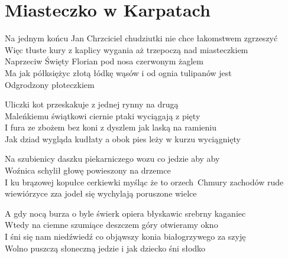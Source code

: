 \section{Miasteczko w Karpatach}
\begin{text}
Na jednym końcu Jan Chrzciciel chudziutki nie chce łakomstwem zgrzeszyć\\
Więc tłuste kury z kaplicy wygania aż trzepoczą nad miasteczkiem\\
Naprzeciw Święty Florian pod nosa czerwonym żaglem\\
Ma jak półksiężyc złotą łódkę wąsów i od ognia tulipanów jest\\
Odgrodzony płoteczkiem

Uliczki kot przeskakuje z jednej rynny na drugą\\
Maleńkiemu świątkowi ciernie ptaki wyciągają z pięty\\
I fura ze zbożem bez koni z dyszlem jak laską na ramieniu\\
Jak dziad wygląda kudłaty a obok pies leży w kurzu wyciągnięty

Na szubienicy daszku piekarniczego wozu co jedzie aby aby\\
Woźnica schylił głowę powieszony na drzemce\\
I ku brązowej kopułce cerkiewki myśląc że to orzech\
Chmury zachodów rude wiewiórzyce zza jodeł się wychylają poruszone wielce

A gdy nocą burza o byle świerk opiera błyskawic srebrny kaganiec\\
Wtedy na ciemne szumiące deszczem góry otwieramy okno\\
I śni się nam niedźwiedź co objąwszy konia białogrzywego za szyję\\
Wolno puszczą słoneczną jedzie i jak dziecko śni słodko
\end{text}